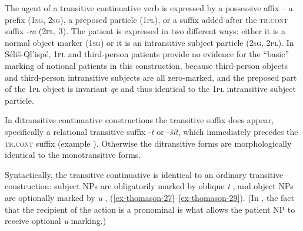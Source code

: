 \documentclass[output=paper,colorlinks,citecolor=brown]{langscibook}
\begin{document}
The agent of a transitive continuative verb is expressed by a
possessive affix -- a prefix (\textsc{1sg}, \textsc{2sg}), a preposed particle (\textsc{1pl}),
or a suffix added after the \textsc{tr.cont} suffix -\emph{m} (\textsc{2pl},
3).  The patient is expressed in two different ways: either it is a
normal object marker (\textsc{1sg}) or it is an intransitive subject particle
(\textsc{2sg}, \textsc{2pl}).  In S\'eli\v{s}-Ql'isp\'e, \textsc{1pl} and third-person patients
provide no evidence for the ``basic'' marking of notional patients in
this construction, because third-person objects and third-person
intransitive subjects are all zero-marked, and the preposed part of
the \textsc{1pl} object is invariant \emph{qe} and thus identical to the \textsc{1pl}
intransitive subject particle.

In ditransitive continuative constructions the transitive suffix does
appear, specifically a relational transitive suffix -\emph{{\textltilde}t} or 
-\emph{\v{s}\'it}, which immediately precedes the \textsc{tr.cont} suffix 
(example ).  Otherwise the ditransitive forms are 
morphologically identical to the monotransitive forms.

Syntactically, the transitive continuative is identical to an ordinary
transitive construction: subject NPs are obligatorily marked by
oblique \emph{t} ,  and object NPs are 
optionally marked by \emph{{\textltilde}u} , 
(\ref{ex-thomason-27}--\ref{ex-thomason-29}).  (In , the 
fact that the recipient of the action is a pronominal is what allows the patient 
NP to receive optional \emph{{\textltilde}u} marking.)
\end{document}
